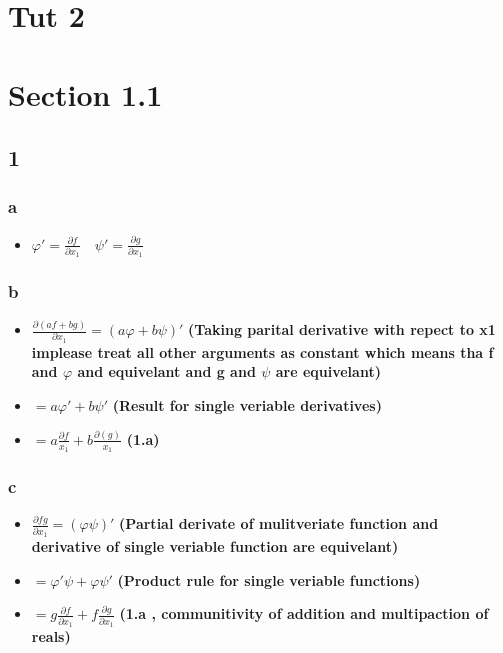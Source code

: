 \documentclass[]{article}
\date{}
\providecommand{\tightlist}{%
  \setlength{\itemsep}{0pt}\setlength{\parskip}{0pt}}
\begin{document}
\hypertarget{tut-2}{%
\section{Tut 2}\label{tut-2}}

\hypertarget{section-1.1}{%
\section{Section 1.1}\label{section-1.1}}

\hypertarget{section}{%
\subsection{1}\label{section}}

\hypertarget{a}{%
\subsubsection{a}\label{a}}

\begin{itemize}
\tightlist
\item
  \(\varphi '= \frac{\partial f}{\partial x_1} \quad \psi ' =\frac{\partial g}{\partial x_1}\)
\end{itemize}

\hypertarget{b}{%
\subsubsection{b}\label{b}}

\begin{itemize}
\tightlist
\item
  \(\frac{\partial (af + bg)}{\partial x_1} = (a \varphi + b \psi)'\)
  \textbf{(Taking parital derivative with repect to x1 implease treat
  all other arguments as constant which means tha f and \(\varphi\) and
  equivelant and g and \(\psi\) are equivelant)}
\item
  \(= a \varphi ' + b \psi '\) \textbf{(Result for single veriable
  derivatives)}
\item
  \(= a \frac{\partial f}{x_1} + b \frac{\partial(g)}{x_1}\)
  \textbf{(1.a)}
\end{itemize}

\hypertarget{c}{%
\subsubsection{c}\label{c}}

\begin{itemize}
\tightlist
\item
  \(\frac{\partial fg}{\partial x_1} = (\varphi \psi)'\)
  \textbf{(Partial derivate of mulitveriate function and derivative of
  single veriable function are equivelant)}
\item
  \(= \varphi' \psi + \varphi \psi'\) \textbf{(Product rule for single
  veriable functions)}
\item
  \(= g \frac{\partial f}{\partial x_1} + f \frac{\partial g}{\partial x_1}\)
  \textbf{(1.a , communitivity of addition and multipaction of reals)}
\end{itemize}
\end{document}
